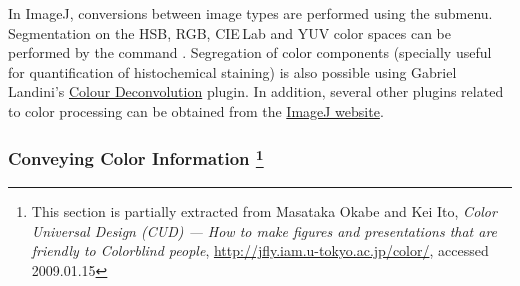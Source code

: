 In ImageJ, conversions between image types are performed using the
submenu. Segmentation on the HSB, RGB, CIE\,Lab and YUV color spaces
can be performed by the 
command \cite{C-ColorThres}. Segregation of color components (specially
useful for quantification of histochemical
staining) is also possible using Gabriel Landini's \href{http://www.dentistry.bham.ac.uk/landinig/software/cdeconv/cdeconv.html}{Colour Deconvolution}
plugin. In addition, several other plugins related to color processing
can be obtained from the \href{http://imagej.nih.gov/ij/plugins/index.html\#color}{ImageJ website}.


\subsubsection*{Conveying Color Information\textmd{}%
\footnote{This section is partially extracted from Masataka Okabe and Kei Ito,
\emph{Color Universal Design (CUD) --- How to make figures and presentations
that are friendly to Colorblind people}, \protect\url{http://jfly.iam.u-tokyo.ac.jp/color/},
accessed 2009.01.15%
}\label{sub:Conveying-Color-Information}}

